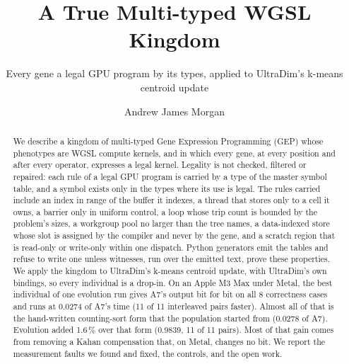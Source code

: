 \documentclass[sigconf,nonacm]{acmart}
\begin{document}
\title{A True Multi-typed WGSL Kingdom}
\subtitle{Every gene a legal GPU program by its types, applied to UltraDim's
k-means centroid update}

\author{Andrew James Morgan}
\renewcommand{\shortauthors}{Morgan}

\begin{abstract}
We describe a kingdom of multi-typed Gene Expression Programming (GEP) whose
phenotypes are WGSL compute kernels, and in which every gene, at every position
and after every operator, expresses a legal kernel. Legality is not checked,
filtered or repaired: each rule of a legal GPU program is carried by a type of
the master symbol table, and a symbol exists only in the types where its use is
legal. The rules carried include an index in range of the buffer it indexes, a
thread that stores only to a cell it owns, a barrier only in uniform control, a
loop whose trip count is bounded by the problem's sizes, a workgroup pool no
larger than the tree names, a data-indexed store whose slot is assigned by the
compiler and never by the gene, and a scratch region that is read-only or
write-only within one dispatch. Python generators emit the tables and refuse to
write one unless witnesses, run over the emitted text, prove these properties.
We apply the kingdom to UltraDim's k-means centroid update, with UltraDim's own
bindings, so every individual is a drop-in. On an Apple M3 Max under Metal, the
best individual of one evolution run gives A7's output bit for bit on all 8
correctness cases and runs at 0.0274 of A7's time (11 of 11 interleaved pairs
faster). Almost all of that is the hand-written counting-sort form that the
population started from (0.0278 of A7). Evolution added 1.6\,\% over that form
(0.9839, 11 of 11 pairs). Most of that gain comes from removing a Kahan
compensation that, on Metal, changes no bit. We report the measurement faults
we found and fixed, the controls, and the open work.
\end{abstract}


\maketitle

\end{document}
